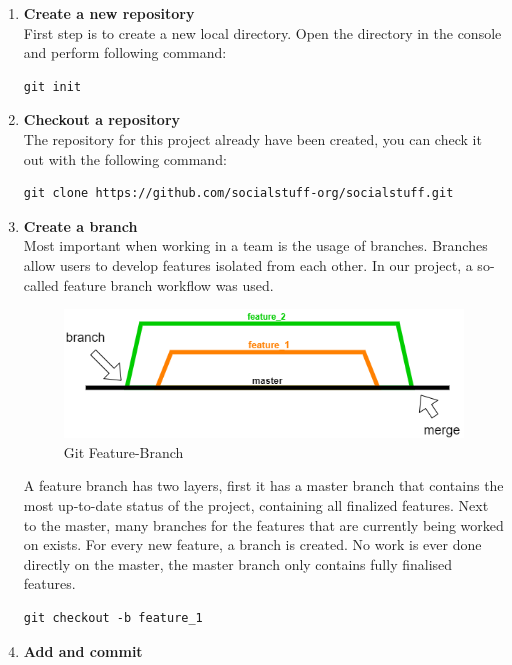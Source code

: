 \begin{enumerate}
    \item \textbf{Create a new repository} \\
    First step is to create a new local directory.
    Open the directory in the console and perform following command:
    \begin{lstlisting}[label={lst:lstlisting2}]
		git init
    \end{lstlisting}
    \item \textbf{Checkout a repository} \\
    The repository for this project already have been created, you can check it out with the following command:
    \begin{lstlisting}[label={lst:lstlisting2}]
		git clone https://github.com/socialstuff-org/socialstuff.git
    \end{lstlisting}
    \item \textbf{Create a branch} \\
    Most important when working in a team is the usage of branches.
    Branches allow users to develop features isolated from each other.
    In our project, a so-called feature branch workflow was used.
    \begin{figure}[h]
        \centering
        \includegraphics[width=1.0\textwidth]{./images/git_branching}
        \caption{Git Feature-Branch}
        \label{fig:gitbranching}
    \end{figure}
    A feature branch has two layers, first it has a master branch that contains the most up-to-date status of the
    project, containing all finalized features.
    Next to the master, many branches for the features that are currently being worked on exists.
    For every new feature, a branch is created.
    No work is ever done directly on the master, the master branch only contains fully finalised features.
    \begin{lstlisting}[label={lst:lstlisting2}]
		git checkout -b feature_1
    \end{lstlisting}
    \item \textbf{Add and commit} \\

\end{enumerate}
